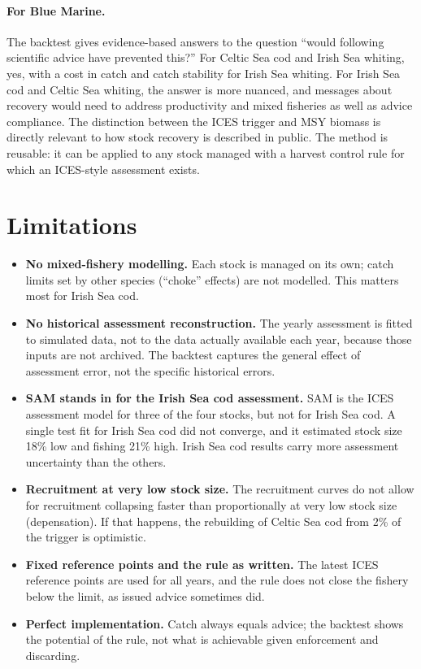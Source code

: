 \documentclass[11pt,a4paper]{article}
\begin{document}
\paragraph{For Blue Marine.} The backtest gives evidence-based answers
to the question ``would following scientific advice have prevented this?''
For Celtic Sea cod and Irish Sea whiting, yes, with a cost in catch and
catch stability for Irish Sea whiting. For Irish Sea cod and Celtic Sea
whiting, the answer is more nuanced, and messages about recovery would need
to address productivity and mixed fisheries as well as advice
compliance. The distinction between the ICES trigger and MSY biomass is
directly relevant to how stock recovery is described in public. The
method is reusable: it can be applied to any stock managed with a harvest
control rule for which an ICES-style assessment exists.

\section{Limitations}
\label{sec:limits}

\begin{itemize}
\item \textbf{No mixed-fishery modelling.} Each stock is managed on its own;
catch limits set by other species (``choke'' effects) are not modelled.
This matters most for Irish Sea cod.
\item \textbf{No historical assessment reconstruction.} The yearly
assessment is fitted to simulated data, not to the data actually available
each year, because those inputs are not archived. The backtest captures
the general effect of assessment error, not the specific historical
errors.
\item \textbf{SAM stands in for the Irish Sea cod assessment.} SAM is the
ICES assessment model for three of the four stocks, but not for Irish Sea
cod. A single test fit for Irish Sea cod did not converge, and it
estimated stock size 18\% low and fishing 21\% high. Irish Sea cod results
carry more assessment uncertainty than the others.
\item \textbf{Recruitment at very low stock size.} The recruitment curves do
not allow for recruitment collapsing faster than proportionally at very
low stock size (depensation). If that happens, the rebuilding of Celtic Sea
cod from 2\% of the trigger is optimistic.
\item \textbf{Fixed reference points and the rule as written.} The latest
ICES reference points are used for all years, and the rule does not close
the fishery below the limit, as issued advice sometimes did.
\item \textbf{Perfect implementation.} Catch always equals advice; the
backtest shows the potential of the rule, not what is achievable given
enforcement and discarding.
\end{itemize}
\end{document}
